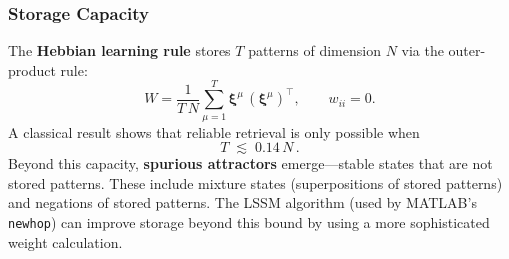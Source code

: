 \subsubsection*{Storage Capacity}

The \textbf{Hebbian learning rule} stores $T$ patterns of dimension $N$ via the outer-product rule:
\begin{equation}
    W = \frac{1}{T\,N}\sum_{\mu=1}^{T} \boldsymbol\xi^{\mu}\,(\boldsymbol\xi^{\mu})^{\!\top}, \qquad w_{ii}=0.
\end{equation}
A classical result \cite{Hopfield} shows that reliable retrieval is only possible when
\begin{equation}\label{eq:capacity}
    T \;\lesssim\; 0.14\,N\,.
\end{equation}
Beyond this capacity, \textbf{spurious attractors} emerge---stable states that are not stored patterns.
These include mixture states (superpositions of stored patterns) and negations of stored patterns.
The LSSM algorithm (used by MATLAB's \texttt{newhop}) can improve storage beyond this bound by using a more sophisticated weight calculation.


